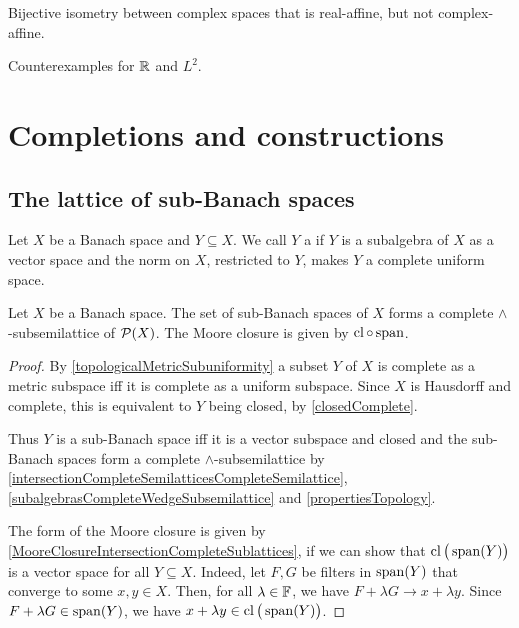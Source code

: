 \begin{example}
Bijective isometry between complex spaces that is real-affine, but not complex-affine.
\end{example}

\begin{theorem}

\end{theorem}

\begin{example}
Counterexamples for $\mathbb{R}$ and $L^2$.
\end{example}

\section{Completions and constructions}
\subsection{The lattice of sub-Banach spaces}
\begin{definition}
Let $X$ be a Banach space and $Y\subseteq X$. We call $Y$ a  if $Y$ is a subalgebra of $X$ as a vector space and the norm on $X$, restricted to $Y$, makes $Y$ a complete uniform space.
\end{definition}

\begin{proposition} \label{subBanachSpaceLattice}
Let $X$ be a Banach space. The set of sub-Banach spaces of $X$ forms a complete $\wedge$-subsemilattice of $\operatorname{\mathcal{P}}(X)$. The Moore closure is given by $\operatorname{cl}\circ \operatorname{span}$.
\end{proposition}
\begin{proof}
By \ref{topologicalMetricSubuniformity} a subset $Y$ of $X$ is complete as a metric subspace iff it is complete as a uniform subspace. Since $X$ is Hausdorff and complete, this is equivalent to $Y$ being closed, by \ref{closedComplete}.

Thus $Y$ is a sub-Banach space iff it is a vector subspace and closed and the sub-Banach spaces form a complete $\wedge$-subsemilattice by \ref{intersectionCompleteSemilatticesCompleteSemilattice}, \ref{subalgebrasCompleteWedgeSubsemilattice} and \ref{propertiesTopology}.

The form of the Moore closure is given by \ref{MooreClosureIntersectionCompleteSublattices}, if we can show that $\operatorname{cl}\big(\operatorname{span}(Y)\big)$ is a vector space for all $Y\subseteq X$. Indeed, let $F,G$ be filters in $\operatorname{span}(Y)$ that converge to some $x,y\in X$. Then, for all $\lambda\in \mathbb{F}$, we have $F+\lambda G \to x+\lambda y$. Since $F+\lambda G \in \operatorname{span}(Y)$, we have $x+\lambda y \in \operatorname{cl}\big(\operatorname{span}(Y)\big)$.
\end{proof}

